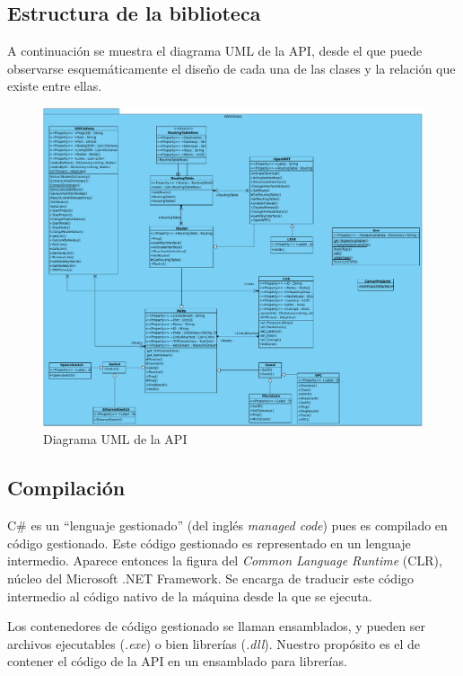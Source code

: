 \subsection{Estructura de la biblioteca}
A continuación se muestra el diagrama UML de la API, desde el que puede observarse esquemáticamente el diseño de cada una de las clases y la relación que existe entre ellas.

\begin{figure}[h]
  \centering
  \includegraphics[scale=0.4]{imagenes/diagrama_api2}
  \caption{Diagrama UML de la API}
  \label{fig:uml_api}
\end{figure}

\subsection{Compilación} \label{subsec:compilation}
C\# es un ``lenguaje gestionado'' (del inglés \textit{managed code}) pues es compilado en código gestionado. Este código gestionado es representado en un lenguaje intermedio. Aparece entonces la figura del \textit{Common Language Runtime} (CLR), núcleo del Microsoft .NET Framework. Se encarga de traducir este código intermedio al código nativo de la máquina desde la que se ejecuta.

Los contenedores de código gestionado se llaman ensamblados, y pueden ser archivos ejecutables (\textit{.exe}) o bien librerías (\textit{.dll})\cite{csnutshell}. Nuestro propósito es el de contener el código de la API en un ensamblado para librerías.

